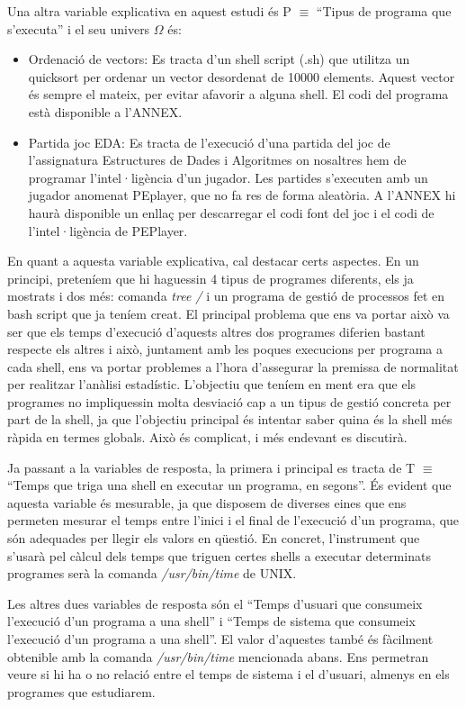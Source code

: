 \documentclass[12pt]{article}
\begin{document}
Una altra variable explicativa en aquest estudi és P $\equiv$ ``Tipus de programa que s'executa'' i el
seu univers $\Omega$ és:
\begin{itemize}
  \item Ordenació de vectors: Es tracta d'un shell script (.sh) que utilitza un quicksort per ordenar un 
    vector desordenat de 10000 elements. Aquest vector és sempre el mateix, per evitar afavorir a alguna shell. El
    codi del programa està disponible a l'ANNEX.
  \item Partida joc EDA: Es tracta de l'execució d'una partida del joc de l'assignatura Estructures de Dades i Algoritmes
    on nosaltres hem de programar l'intel·ligència d'un jugador. Les partides s'executen amb un jugador anomenat
    PEplayer, que no fa res de forma aleatòria. A l'ANNEX hi haurà disponible un enllaç per descarregar el codi font del 
    joc i el codi de l'intel·ligència de PEPlayer.
\end{itemize}

En quant a aquesta variable explicativa, cal destacar certs aspectes. En un principi, preteníem que hi 
haguessin 4 tipus de programes diferents, els ja mostrats i dos més: comanda \textit{tree /} i un programa
de gestió de processos fet en bash script que ja teníem creat. El principal problema que ens va portar això
va ser que els temps d'execució d'aquests altres dos programes diferien bastant respecte els altres i això, juntament
amb les poques execucions per programa a cada shell, ens va portar problemes a l'hora d'assegurar la premissa
de normalitat per realitzar l'anàlisi estadístic. L'objectiu que teníem en ment era que els programes no 
impliquessin molta desviació cap a un tipus de gestió concreta per part de la shell, ja que l'objectiu principal
és intentar saber quina és la shell més ràpida en termes globals. Això és complicat, i més endevant es discutirà.


Ja passant a la variables de resposta, la primera i principal es tracta de T $\equiv$ ``Temps que triga una shell 
en executar un programa, en segons''. És evident que aquesta variable és mesurable, 
ja que disposem de diverses eines que ens permeten mesurar el temps entre l'inici i el final de 
l'execució d'un programa, que són adequades per llegir els valors en qüestió. En concret, 
l'instrument que s'usarà pel càlcul dels temps que triguen certes shells a executar determinats 
programes serà la comanda \textit{/usr/bin/time} de UNIX.

Les altres dues variables de resposta són el ``Temps d'usuari que consumeix l'execució d'un programa a una shell'' i
``Temps de sistema que consumeix l'execució d'un programa a una shell''. El valor d'aquestes també és
fàcilment obtenible amb la comanda \textit{/usr/bin/time} mencionada abans. Ens permetran veure si hi ha o no
relació entre el temps de sistema i el d'usuari, almenys en els programes que estudiarem.
\end{document}
